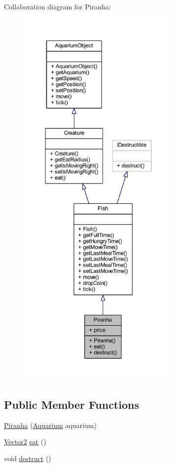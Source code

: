 Collaboration diagram for Piranha\+:
\nopagebreak
\begin{figure}[H]
\begin{center}
\leavevmode
\includegraphics[height=550pt]{class_piranha__coll__graph}
\end{center}
\end{figure}
\subsection*{Public Member Functions}
\begin{DoxyCompactItemize}
\item 
\mbox{\hyperlink{class_piranha_a0d2354ea604a506033fa6fccee6d7be1}{Piranha}} (\mbox{\hyperlink{class_aquarium}{Aquarium}} aquarium)
\item 
\mbox{\hyperlink{class_vector2}{Vector2}} \mbox{\hyperlink{class_piranha_a2d47b544cd3f2dfd6321fdceeb16fbc8}{eat}} ()
\item 
void \mbox{\hyperlink{class_piranha_a24179eed654ed9d8a8bc4517ddae3533}{destruct}} ()
\end{DoxyCompactItemize}
